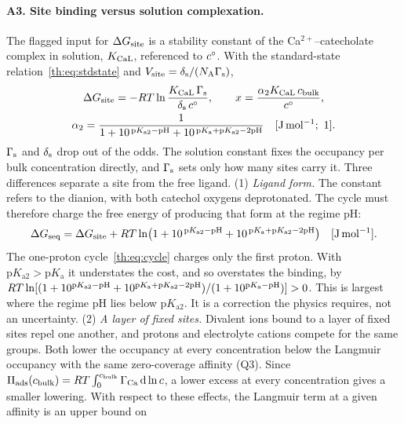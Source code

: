 \paragraph{A3. Site binding versus solution complexation.} The flagged input for $\Delta G_\mathrm{site}$ is a
stability constant of the Ca$^{2+}$--catecholate complex in solution, $K_\mathrm{CaL}$, referenced to
$c^{\circ}$. With the standard-state relation~\eqref{th:eq:stdstate} and $V_\mathrm{site}=\delta_\mathrm{s}/(N_\mathrm{A}\Gamma_\mathrm{s})$,
\begin{equation}\label{th:eq:x-analog}
\begin{gathered}
\Delta G_\mathrm{site}=-R T\ln\frac{K_\mathrm{CaL}\,\Gamma_\mathrm{s}}{\delta_\mathrm{s}\,c^{\circ}},\qquad
x=\frac{\alpha_2K_\mathrm{CaL}\,c_\mathrm{bulk}}{c^{\circ}},\\
\alpha_2=\frac{1}{1+10^{\,\mathrm{p}K_\mathrm{a2}-\mathrm{pH}}+10^{\,\mathrm{p}K_\mathrm{a}+\mathrm{p}K_\mathrm{a2}-2\mathrm{pH}}} \quad[\mathrm{J\,mol^{-1};\ 1}].
\end{gathered}
\end{equation}
$\Gamma_\mathrm{s}$ and $\delta_\mathrm{s}$ drop out of the odds. The solution constant fixes the occupancy per bulk concentration
directly, and $\Gamma_\mathrm{s}$ sets only how many sites carry it. Three differences separate a site from the free
ligand.
(1) \emph{Ligand form.} The constant refers to the dianion, with both catechol oxygens
deprotonated. The cycle must therefore charge the free energy of producing that form at the regime pH:
\begin{equation}\label{th:eq:cycle2}
\Delta G_\mathrm{seq}=\Delta G_\mathrm{site}+R T\ln\!\big(1+10^{\,\mathrm{p}K_\mathrm{a2}-\mathrm{pH}}+10^{\,\mathrm{p}K_\mathrm{a}+\mathrm{p}K_\mathrm{a2}-2\mathrm{pH}}\big) \quad[\mathrm{J\,mol^{-1}}].
\end{equation}
The one-proton cycle~\eqref{th:eq:cycle} charges only the first proton. With
$\mathrm{p}K_\mathrm{a2}>\mathrm{p}K_\mathrm{a}$ it understates the cost, and so overstates the binding, by
$R T\ln[(1+10^{\mathrm{p}K_\mathrm{a2}-\mathrm{pH}}+10^{\mathrm{p}K_\mathrm{a}+\mathrm{p}K_\mathrm{a2}-2\mathrm{pH}})/(1+10^{\mathrm{p}K_\mathrm{a}-\mathrm{pH}})]>0$.
This is largest where the regime pH lies below $\mathrm{p}K_\mathrm{a2}$. It is a correction the
physics requires, not an uncertainty.
(2) \emph{A layer of fixed sites.} Divalent ions bound to a layer of fixed sites repel one another, and
protons and electrolyte cations compete for the same groups. Both lower the occupancy at every
concentration below the Langmuir occupancy with the same zero-coverage affinity (Q3). Since
$\Pi_\mathrm{ads}(c_\mathrm{bulk})=R T\int_0^{c_\mathrm{bulk}}\Gamma_\mathrm{Ca}\,\mathrm{d}\ln c$, a lower excess at every concentration gives a smaller
lowering. With respect to these effects, the Langmuir term at a given affinity is an upper bound on
